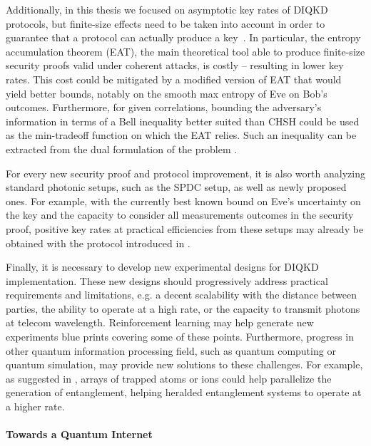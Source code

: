 Additionally, in this thesis we focused on asymptotic key rates of DIQKD protocols, but finite-size effects need to be taken into account in order to guarantee that a protocol can actually produce a key~\cite{Tan2021}.
In particular, the entropy accumulation theorem (EAT), the main theoretical tool able to produce finite-size security proofs valid under coherent attacks, is costly -- resulting in lower key rates.
This cost could be mitigated by a modified version of EAT that would yield better bounds, notably on the smooth max entropy of Eve on Bob's outcomes.
Furthermore, for given correlations, bounding the adversary's information in terms of a Bell inequality better suited than CHSH could be used as the min-tradeoff function on which the EAT relies.
Such an inequality can be extracted from the dual formulation of the problem .

\medbreak

For every new security proof and protocol improvement, it is also worth analyzing standard photonic setups, such as the SPDC setup, as well as newly proposed ones.
For example, with the currently best known bound on Eve's uncertainty on the key and the capacity to consider all measurements outcomes in the security proof, positive key rates at practical efficiencies from these setups may already be obtained with the protocol introduced in \cite{Brown2021}.


\medbreak 

Finally, it is necessary to develop new experimental designs for DIQKD implementation.
These new designs should progressively address practical requirements and limitations, e.g. a decent scalability with the distance between parties, the ability to operate at a high rate, or the capacity to transmit photons at telecom wavelength.
Reinforcement learning may help generate new experiments blue prints covering some of these points.
Furthermore, progress in other quantum information processing field, such as quantum computing or quantum simulation, may provide new solutions to these challenges.
For example, as suggested in \cite{Zapatero2023}, arrays of trapped atoms or ions could help parallelize the generation of entanglement, helping heralded entanglement systems to operate at a higher rate.

\paragraph{Towards a Quantum Internet}

